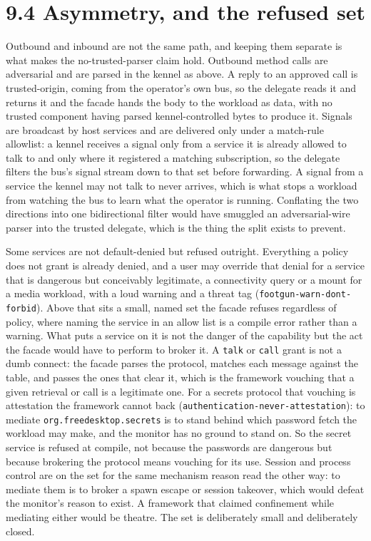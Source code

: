 \hypertarget{asymmetry-and-the-refused-set}{%
\section{9.4 Asymmetry, and the refused
set}\label{asymmetry-and-the-refused-set}}

Outbound and inbound are not the same path, and keeping them separate is
what makes the no-trusted-parser claim hold. Outbound method calls are
adversarial and are parsed in the kennel as above. A reply to an
approved call is trusted-origin, coming from the operator's own bus, so
the delegate reads it and returns it and the facade hands the body to
the workload as data, with no trusted component having parsed
kennel-controlled bytes to produce it. Signals are broadcast by host
services and are delivered only under a match-rule allowlist: a kennel
receives a signal only from a service it is already allowed to talk to
and only where it registered a matching subscription, so the delegate
filters the bus's signal stream down to that set before forwarding. A
signal from a service the kennel may not talk to never arrives, which is
what stops a workload from watching the bus to learn what the operator
is running. Conflating the two directions into one bidirectional filter
would have smuggled an adversarial-wire parser into the trusted
delegate, which is the thing the split exists to prevent.

Some services are not default-denied but refused outright. Everything a
policy does not grant is already denied, and a user may override that
denial for a service that is dangerous but conceivably legitimate, a
connectivity query or a mount for a media workload, with a loud warning
and a threat tag (\texttt{footgun-warn-dont-forbid}). Above that sits a
small, named set the facade refuses regardless of policy, where naming
the service in an allow list is a compile error rather than a warning.
What puts a service on it is not the danger of the capability but the
act the facade would have to perform to broker it. A \texttt{talk} or
\texttt{call} grant is not a dumb connect: the facade parses the
protocol, matches each message against the table, and passes the ones
that clear it, which is the framework vouching that a given retrieval or
call is a legitimate one. For a secrets protocol that vouching is
attestation the framework cannot back
(\texttt{authentication-never-attestation}): to mediate
\texttt{org.freedesktop.secrets} is to stand behind which password fetch
the workload may make, and the monitor has no ground to stand on. So the
secret service is refused at compile, not because the passwords are
dangerous but because brokering the protocol means vouching for its use.
Session and process control are on the set for the same mechanism reason
read the other way: to mediate them is to broker a spawn escape or
session takeover, which would defeat the monitor's reason to exist. A
framework that claimed confinement while mediating either would be
theatre. The set is deliberately small and deliberately closed.

